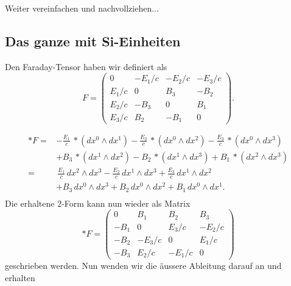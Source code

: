Weiter vereinfachen und nachvollziehen...

\subsection{Das ganze mit Si-Einheiten}
Den Faraday-Tensor haben wir definiert als
\begin{equation}
	F = \begin{pmatrix}
		0 & -E_1/c & -E_2/c & -E_3/c \\ E_1/c & 0 & B_3 & -B_2 \\ E_2/c & -B_3 & 0 & B_1 \\ E_3/c & B_2 & -B_1 & 0 
	\end{pmatrix}.
\end{equation}

\begin{align*}
	\ast F =
	& - \frac{E_{1}}{c} \, \ast(dx^0 \wedge dx^1) - \frac{E_{2}}{c} \, \ast(dx^0 \wedge dx^2) - \frac{E_{3}}{c} \, \ast(dx^0 \wedge dx^3) \\
	& + B_3 \, \ast(dx^1 \wedge dx^2) - B_2 \, \ast(dx^1 \wedge dx^3) + B_1 \, \ast(dx^2 \wedge dx^3)\\
	= 
	& \, \frac{E_{1}}{c} \, dx^2 \wedge dx^3 - \frac{E_{2}}{c} \, dx^1 \wedge dx^3 + \frac{E_{3}}{c} \, dx^1 \wedge dx^2 \\
	& + B_3 \, dx^0 \wedge dx^3 + B_2 \, dx^0 \wedge dx^2 + B_1 \, dx^0 \wedge dx^1.\\
\end{align*}
Die erhaltene 2-Form kann nun wieder als Matrix
\begin{equation}
	\ast F = \begin{pmatrix}
		0 & B_1 & B_2 & B_3 \\ -B_1 & 0 & E_3/c & -E_2/c \\ -B_2 & -E_3/c & 0 & E_1/c \\ -B_3 & E_2/c & -E_1/c & 0 
	\end{pmatrix}
\end{equation}
geschrieben werden.
Nun wenden wir die äussere Ableitung darauf an und erhalten

